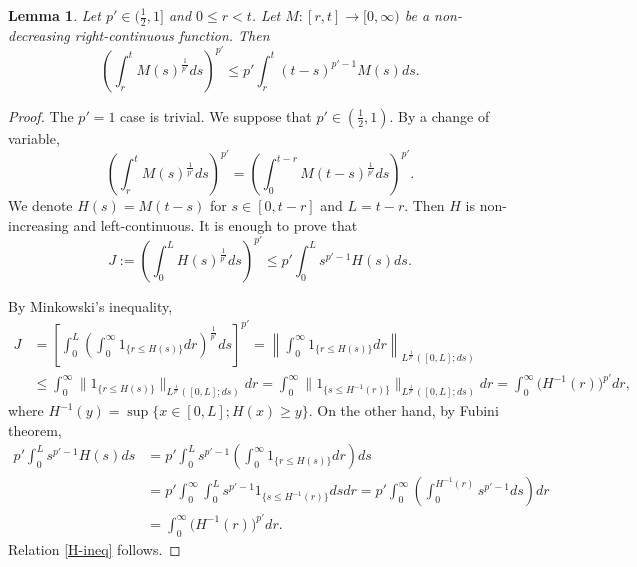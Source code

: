\documentclass[12pt]{article}
\newtheorem{lemma}[theorem]{Lemma}
\begin{document}
\begin{lemma} \label{incr ineq}
Let $p' \in (\frac12,1]$ and $0 \leq r<t$. Let $M:[r,t] \to [0,\infty)$ be a non-decreasing right-continuous function. Then
\[
 \left( \int_r^t M(s)^{\frac{1}{p'}} ds \right)^{p'} \leq p' \int_r^t (t-s)^{p'-1} M(s) ds.
\]
\end{lemma}

\begin{proof} 
The $p'= 1$ case is trivial.
We suppose that $p'\in (\frac12,1)$.  By a change of variable,
\[
\left( \int_r^t M(s)^{\frac{1}{p'}} ds \right)^{p'} =\left( \int_0^{t-r} M(t-s)^{\frac{1}{p'}} ds \right)^{p'}.%
\]
We denote $H(s)=M(t-s)$ for $s \in [0,t-r]$ and $L=t-r$. Then $H$ is non-increasing and left-continuous. It is enough to prove that
\begin{equation}
\label{H-ineq}
J:=\left( \int_0^L H(s)^{\frac{1}{p'}} ds \right)^{p'} \leq p' \int_0^L s^{p'-1} H(s) ds.
\end{equation}

By Minkowski's inequality,
\begin{align*}
J  &= \left[ \int_0^L \left( \int_0^{\infty} 1_{\{r\leq H(s)\}} dr\right)^{\frac{1}{p'}}ds \right]^{p'} = \left\| \int_0^{\infty}1_{\{r \leq H(s)\}} dr\right\|_{L^{\frac{1}{p'}}([0,L];ds)}\\
& \leq \int_0^{\infty} \|1_{\{r \leq H(s)\}} \|_{L^{\frac{1}{p'}}([0,L];ds)} dr=\int_0^{\infty} \|1_{\{s \leq H^{-1}(r)\}} \|_{L^{\frac{1}{p'}}([0,L];ds)} dr=\int_0^{\infty}\big(H^{-1}(r)\big)^{p'}dr,
\end{align*}
where $H^{-1}(y)=\sup\{x \in [0,L];H(x)\geq y\}$. On the other hand, by Fubini theorem,
\begin{align*}
p' \int_0^L s^{p'-1} H(s) ds&=p' \int_0^L s^{p'-1} \left(\int_0^{\infty} 1_{\{r \leq H(s)\}} dr \right) ds\\
& = p' \int_0^{\infty} \int_0^L s^{p'-1} 1_{\{s \leq H^{-1}(r)\}} dsdr=p' \int_0^{\infty} \left(\int_0^{H^{-1}(r)} s^{p'-1}ds \right) dr\\
&=\int_0^{\infty} \big(H^{-1}(r)\big)^{p'}dr.
\end{align*}
Relation \eqref{H-ineq} follows.
\end{proof}
\end{document}
